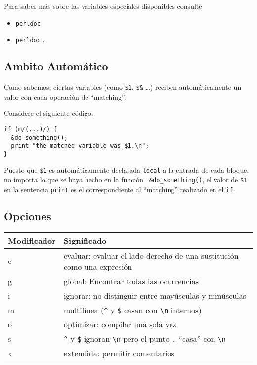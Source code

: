 
Para saber más sobre las variables especiales disponibles
consulte 

\begin{itemize}
\item \verb|perldoc| 
\item \verb|perldoc| .
\end{itemize}

\subsection{Ambito Automático}

Como sabemos, ciertas variables (como \verb|$1|, \verb|$&| \ldots )
reciben autom\'aticamente un valor con cada operaci\'{o}n
de ``matching''.  

Considere el siguiente c\'{o}digo:
\begin{verbatim}
if (m/(...)/) {
  &do_something();
  print "the matched variable was $1.\n";
}
\end{verbatim}
Puesto que \verb|$1| es autom\'aticamente declarada \verb|local|
a la entrada de cada bloque, no importa lo que se haya
hecho en la funci\'{o}n \verb| &do_something()|, el valor de 
\verb|$1| en la sentencia \verb|print| es el correspondiente
al ``matching'' realizado en el \verb|if|.

\subsection{Opciones}
\label{section:opciones}
\begin{tabular}{l|l}
Modificador & Significado\\
\hline
e           & evaluar: evaluar el lado derecho de una sustitución como una expresión\\
g           & global: Encontrar todas las ocurrencias\\
i           & ignorar: no distinguir entre mayúsculas y minúsculas\\
m           & multilínea (\verb|^| y \verb|$| casan con \verb|\n| internos)\\
o           & optimizar: compilar una sola vez\\
s           & \verb|^| y \verb|$| ignoran \verb|\n| pero el punto \verb|.| ``casa'' con \verb|\n|\\
x           & extendida: permitir comentarios\\
\end{tabular}

